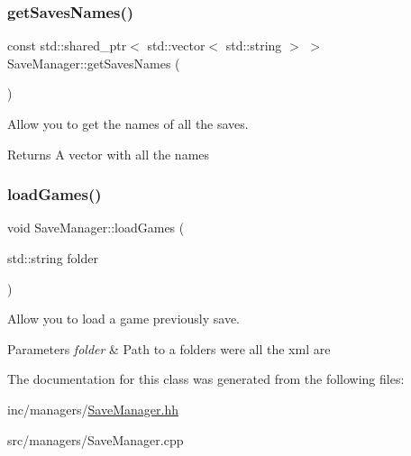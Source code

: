 \subsubsection{\texorpdfstring{get\+Saves\+Names()}{getSavesNames()}}
{\footnotesize\ttfamily const std\+::shared\+\_\+ptr$<$ std\+::vector$<$ std\+::string $>$ $>$ Save\+Manager\+::get\+Saves\+Names (\begin{DoxyParamCaption}{ }\end{DoxyParamCaption})}



Allow you to get the names of all the saves. 

\begin{DoxyReturn}{Returns}
A vector with all the names 
\end{DoxyReturn}
\mbox{\label{classSaveManager_a96c17debbf9765e8c71e74010621585f}} 
\subsubsection{\texorpdfstring{load\+Games()}{loadGames()}}
{\footnotesize\ttfamily void Save\+Manager\+::load\+Games (\begin{DoxyParamCaption}\item[{std\+::string}]{folder }\end{DoxyParamCaption})}



Allow you to load a game previously save. 


\begin{DoxyParams}{Parameters}
{\em folder} & Path to a folders were all the xml are \\
\hline
\end{DoxyParams}


The documentation for this class was generated from the following files\+:\begin{DoxyCompactItemize}
\item 
inc/managers/\hyperlink{SaveManager_8hh}{Save\+Manager.\+hh}\item 
src/managers/Save\+Manager.\+cpp\end{DoxyCompactItemize}
